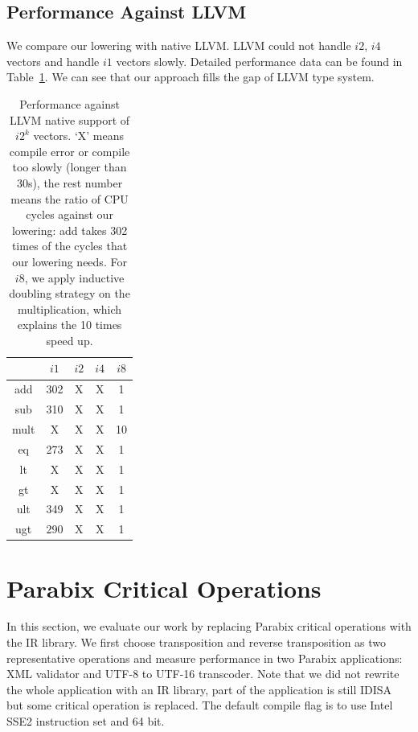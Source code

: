 \subsection{Performance Against LLVM}
We compare our lowering with native LLVM\@. LLVM could not handle $i2$, $i4$ vectors and handle $i1$ vectors slowly. Detailed performance data can be found in Table~\ref{table:vector_perf_LLVM}. We can see that our approach fills the gap of LLVM type system.

\begin{table}[h]
\centering
\begin{tabular}{|c|c|c|c|c|}
\hline
     & $i1$ & $i2$ & $i4$ & $i8$ \\ \hline
add  & 302  & X    & X    & 1\\ \hline
sub  & 310  & X    & X    & 1\\ \hline
mult & X    & X    & X    & 10\\ \hline
eq   & 273  & X    & X    & 1\\ \hline
lt   & X    & X    & X    & 1\\ \hline
gt   & X    & X    & X    & 1\\ \hline
ult  & 349  & X    & X    & 1\\ \hline
ugt  & 290  & X    & X    & 1\\ \hline
\end{tabular}
\caption[Performance Against LLVM Native Support for $i2^k$ Vectors]{Performance against LLVM native support of $i2^k$ vectors. `X' means compile error or compile too slowly (longer than 30s), the rest number means the ratio of CPU cycles against our lowering: add takes 302 times of the cycles that our lowering needs. For $i8$, we apply inductive doubling strategy on the multiplication, which explains the 10 times speed up. }
\label{table:vector_perf_LLVM}
\end{table}

\section{Parabix Critical Operations}
In this section, we evaluate our work by replacing Parabix critical operations with the IR library. We first choose transposition and reverse transposition as two representative operations and measure performance in two Parabix applications: XML validator and UTF-8 to UTF-16 transcoder. Note that we did not rewrite the whole application with an IR library, part of the application is still IDISA but some critical operation is replaced. The default compile flag is to use Intel SSE2 instruction set and 64 bit.

